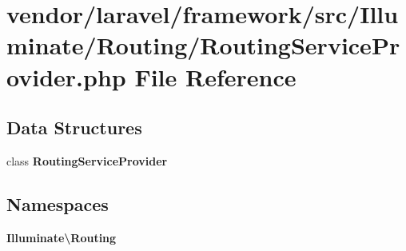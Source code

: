 \section{vendor/laravel/framework/src/\+Illuminate/\+Routing/\+Routing\+Service\+Provider.php File Reference}
\label{_routing_service_provider_8php}
\subsection*{Data Structures}
\begin{DoxyCompactItemize}
\item 
class {\bf Routing\+Service\+Provider}
\end{DoxyCompactItemize}
\subsection*{Namespaces}
\begin{DoxyCompactItemize}
\item 
 {\bf Illuminate\textbackslash{}\+Routing}
\end{DoxyCompactItemize}
